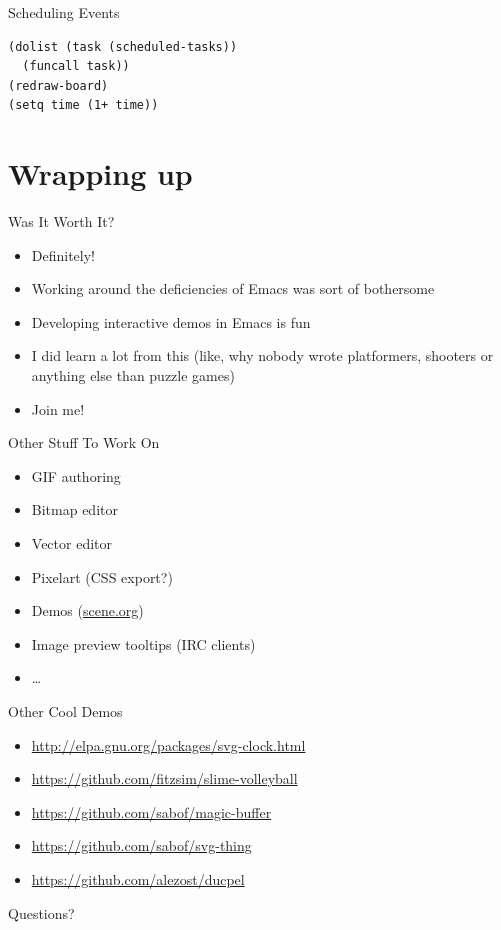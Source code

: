 \documentclass[presentation]{beamer}
\begin{document}
\begin{frame}[fragile,label=sec-4-14]{Scheduling Events}
 \begin{verbatim}
(dolist (task (scheduled-tasks))
  (funcall task))
(redraw-board)
(setq time (1+ time))
\end{verbatim}
\end{frame}

\section{Wrapping up}
\label{sec-5}

\begin{frame}[label=sec-5-1]{Was It Worth It?}
\begin{itemize}
\item Definitely!
\item Working around the deficiencies of Emacs was sort of bothersome
\item Developing interactive demos in Emacs is fun
\item I did learn a lot from this (like, why nobody wrote platformers,
shooters or anything else than puzzle games)
\item Join me!
\end{itemize}
\end{frame}

\begin{frame}[label=sec-5-2]{Other Stuff To Work On}
\begin{itemize}
\item GIF authoring
\item Bitmap editor
\item Vector editor
\item Pixelart (CSS export?)
\item Demos (\href{https://www.scene.org/}{scene.org})
\item Image preview tooltips (IRC clients)
\item \ldots{}
\end{itemize}
\end{frame}

\begin{frame}[label=sec-5-3]{Other Cool Demos}
\begin{itemize}
\item \url{http://elpa.gnu.org/packages/svg-clock.html}
\item \url{https://github.com/fitzsim/slime-volleyball}
\item \url{https://github.com/sabof/magic-buffer}
\item \url{https://github.com/sabof/svg-thing}
\item \url{https://github.com/alezost/ducpel}
\end{itemize}
\end{frame}

\begin{frame}[label=sec-5-4]{Questions?}
\end{frame}
\end{document}
